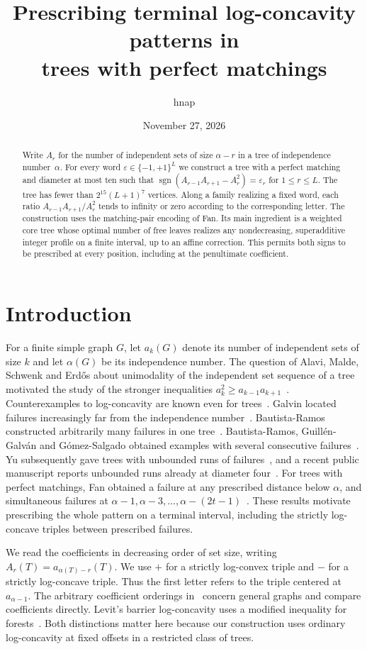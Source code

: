 \documentclass[11pt]{article}
\title{Prescribing terminal log-concavity patterns in\texorpdfstring{\\}{ }trees with perfect matchings}
\author{hnap}
\date{November 27, 2026}
\theoremstyle{definition}\newtheorem{example}[theorem]{Example}
\newcommand{\sig}{\operatorname{sgn}}
\begin{document}
\maketitle
\begin{abstract}
Write $A_r$ for the number of independent sets of size $\alpha-r$ in a tree of independence number~$\alpha$. For every word $\varepsilon\in\{-1,+1\}^L$ we construct a tree with a perfect matching and diameter at most ten such that $\sig(A_{r-1}A_{r+1}-A_r^2)=\varepsilon_r$ for $1\le r\le L$. The tree has fewer than $2^{15}(L+1)^7$ vertices. Along a family realizing a fixed word, each ratio $A_{r-1}A_{r+1}/A_r^2$ tends to infinity or zero according to the corresponding letter. The construction uses the matching-pair encoding of Fan. Its main ingredient is a weighted core tree whose optimal number of free leaves realizes any nondecreasing, superadditive integer profile on a finite interval, up to an affine correction. This permits both signs to be prescribed at every position, including at the penultimate coefficient.
\end{abstract}

\section{Introduction}
For a finite simple graph $G$, let $a_k(G)$ denote its number of independent sets of size $k$ and let $\alpha(G)$ be its independence number. The question of Alavi, Malde, Schwenk and Erd\H{o}s about unimodality of the independent set sequence of a tree motivated the study of the stronger inequalities $a_k^2\ge a_{k-1}a_{k+1}$~\cite{alavi,galvin}. Counterexamples to log-concavity are known even for trees~\cite{kadrawi}. Galvin located failures increasingly far from the independence number~\cite{galvin}. Bautista-Ramos constructed arbitrarily many failures in one tree~\cite{br}. Bautista-Ramos, Guill\'en-Galv\'an and G\'omez-Salgado obtained examples with several consecutive failures~\cite{bgg}. Yu subsequently gave trees with unbounded runs of failures~\cite{yu}, and a recent public manuscript reports unbounded runs already at diameter four~\cite{ep}. For trees with perfect matchings, Fan obtained a failure at any prescribed distance below $\alpha$, and simultaneous failures at $\alpha-1,\alpha-3,\ldots,\alpha-(2t-1)$~\cite{fan}. These results motivate prescribing the whole pattern on a terminal interval, including the strictly log-concave triples between prescribed failures.

We read the coefficients in decreasing order of set size, writing $A_r(T)=a_{\alpha(T)-r}(T)$. We use $+$ for a strictly log-convex triple and $-$ for a strictly log-concave triple. Thus the first letter refers to the triple centered at $a_{\alpha-1}$.
The arbitrary coefficient orderings in~\cite{alavi} concern general graphs and compare coefficients directly. Levit's barrier log-concavity uses a modified inequality for forests~\cite{barrier}. Both distinctions matter here because our construction uses ordinary log-concavity at fixed offsets in a restricted class of trees.
\end{document}
